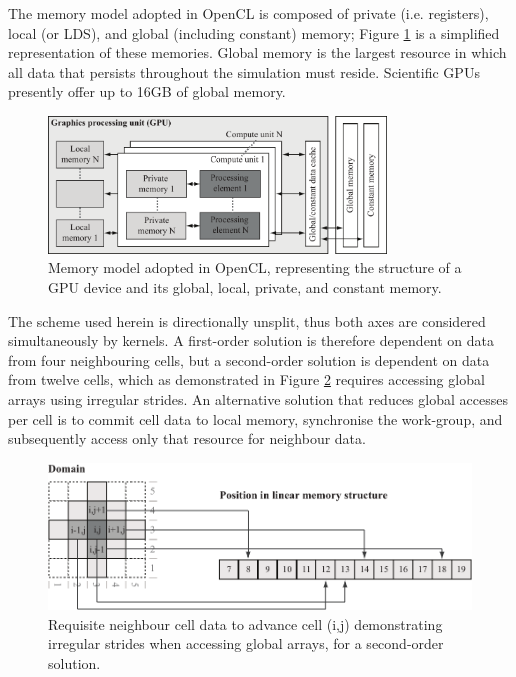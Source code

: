 The memory model adopted in OpenCL is composed of private (i.e. registers), local (or LDS), and global (including constant) memory; Figure \ref{OpenCLStructure} is a simplified representation of these memories. Global memory is the largest resource in which all data that persists throughout the simulation must reside. Scientific GPUs presently offer up to 16GB of global memory.

\begin{figure}[tpb]
	\centering
	\includegraphics[width=0.8\textwidth]{heterogeneous-dev-figures/Figure_2_Greyscale.pdf}
	\caption{Memory model adopted in OpenCL, representing the structure of a GPU device and its global, local, private, and constant memory.}
	\label{OpenCLStructure}
\end{figure}

The scheme used herein is directionally unsplit, thus both axes are considered simultaneously by kernels. A first-order solution is therefore dependent on data from four neighbouring cells, but a second-order solution is dependent on data from twelve cells, which as demonstrated in Figure \ref{RequisiteCellData} requires accessing global arrays using irregular strides. An alternative solution that reduces global accesses per cell is to commit cell data to local memory, synchronise the work-group, and subsequently access only that resource for neighbour data. 

\begin{figure}[tpb]
	\centering
	\includegraphics[width=1.0\textwidth]{heterogeneous-dev-figures/Figure_3_Greyscale.pdf}
	\caption{Requisite neighbour cell data to advance cell (i,j) demonstrating irregular strides when accessing global arrays, for a second-order solution.}
	\label{RequisiteCellData}
\end{figure}

